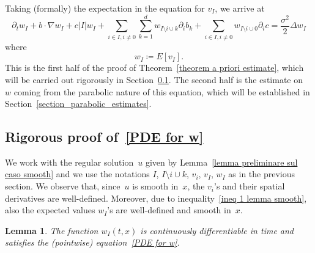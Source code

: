 \documentclass[a4paper,10pt]{article}
\newtheorem{lemma}[theorem]{Lemma}
\newcommand\1{\mathbbm{1}}
\numberwithin{equation}{section}
\begin{document}
Taking (formally) the expectation in the equation for $v_{I}$, we arrive at 
\begin{equation}
\partial_{t}w_{I}+b\cdot\nabla w_{I}+c\left\vert I\right\vert w_{I}+\sum_{i\in I,i\neq0}\sum_{k=1}^{d}w_{I\setminus i\cup k}\partial_{i}b_{k}+\sum_{i\in
I,i\neq0}w_{I\setminus i\cup0}\partial_{i}c=\frac{\sigma^{2}}{2}\Delta w_{I}\label{PDE for w} 
\end{equation}
where 
\begin{equation*}
w_{I}\coloneqq E[  v_{I}]  .
\end{equation*}
This is the first half of the proof of Theorem~\ref{theorem a priori estimate}, which will be carried out rigorously in Section~\ref{section_rigorous_w}. The second half is the estimate on~$w$ coming from the parabolic nature of this equation, which will be established in Section~\ref{section_parabolic_estimates}.

\subsection{Rigorous proof of~\eqref{PDE for w}}
\label{section_rigorous_w}

We work with the regular solution~$u$ given by Lemma~\ref{lemma preliminare sul caso smooth} and we use the notations $I$, $I\setminus i\cup k$, $v_{i}$, $v_{I}$, $w_{I}$ as in the previous section. We observe that, since~$u$ is smooth in~$x$, the $v_{i}$'s and their spatial derivatives are well-defined. Moreover, due to inequality~\eqref{ineq 1 lemma smooth}, also the expected values $w_{I}$'s are well-defined and smooth in~$x$.

\begin{lemma}
The function $w_{I}(t,x)$ is continuously differentiable in
time and satisfies the \textup{(}pointwise\textup{)} equation~\eqref{PDE for w}.
\end{lemma}
\end{document}
